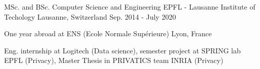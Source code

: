 


\begin{cventries}
	
	\cventry
	{MSc. and BSc. Computer Science and Engineering} %
	{EPFL - Lausanne Institute of Techology} %
	{Lausanne, Switzerland} %
	{Sep. 2014 - July 2020} %
	{ %
		\begin{cvitems}
			\item {One year abroad at ENS (Ecole Normale Supérieure) Lyon, France}
			\item {Eng. internship at Logitech (Data science), semester project at SPRING lab EPFL (Privacy), Master Thesis in PRIVATICS team INRIA (Privacy)}
		\end{cvitems}
	}
	
	
	
	
\end{cventries}